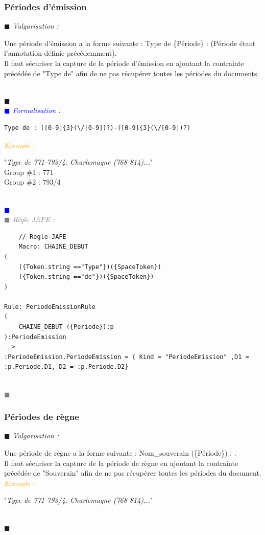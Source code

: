 \documentclass[a4paper, 11pt]{report}
\newenvironment{vulgarisation}
    {
    \textit{\textcolor{dark-blue}{$\blacksquare$  Vulgarisation : \\}}

    }
    {
    ~\\\textcolor{dark-blue}{$\blacksquare$}\\
    }
\newenvironment{formalisation}
    {
    \textit{\textcolor{blue}{$\blacksquare$  Formalisation : \\}}
    }
    {
    ~\\\textcolor{blue}{$\blacksquare$}\\
    }
\newenvironment{codage}
    {
    \textit{\textcolor{gray}{$\blacksquare$  Règle JAPE : \\}}
    }
    {
    ~\\\textcolor{gray}{$\blacksquare$}\\
    }
\newenvironment{exemple}
    {
    \textit{\textcolor{orange}{
    Exemple : \\}}
    }
    {~\\
    }
\begin{document}
\newpage
\subsubsection{Périodes d'émission}
\begin{vulgarisation}
	Une période d'émission a la forme suivante :  \og Type de \{Période\} : \fg{} (Période étant l'annotation définie précédemment).\\
	Il faut sécuriser la capture de la période d'émission en ajoutant la contrainte précédée de "Type de" afin de ne pas récupérer toutes les périodes du documents.
\end{vulgarisation}
\begin{formalisation}
	\begin{verbatim}
Type de : ([0-9]{3}(\/[0-9])?)-([0-9]{3}(\/[0-9])?)
	\end{verbatim}
	\begin{exemple}
		"\emph{Type de 771-793/4: Charlemagne (768-814)...}" \\
		Group \#1 : 771 \\
		Group \#2 : 793/4
	\end{exemple}

\end{formalisation}
			\begin{codage}
	\begin{lstlisting}
	// Regle JAPE
	Macro: CHAINE_DEBUT
(
    ({Token.string =="Type"})({SpaceToken})
    ({Token.string =="de"})({SpaceToken})
)

Rule: PeriodeEmissionRule
(
    CHAINE_DEBUT ({Periode}):p
):PeriodeEmission
-->
:PeriodeEmission.PeriodeEmission = { Kind = "PeriodeEmission" ,D1 = :p.Periode.D1, D2 = :p.Periode.D2}
	\end{lstlisting}
	\end{codage}

\subsubsection{Périodes de règne}
\begin{vulgarisation}
	Une période de règne a la forme suivante : \og Nom\_souverain (\{Période\}) : \fg{}.\\
	Il faut sécuriser la capture de la période de règne en ajoutant la contrainte précédée de "Souverain" afin de ne pas récupérer toutes les périodes du document.\\
	\begin{exemple}
		"\emph{Type de 771-793/4: Charlemagne (768-814)...}" 
	\end{exemple}
\end{vulgarisation}
\end{document}
